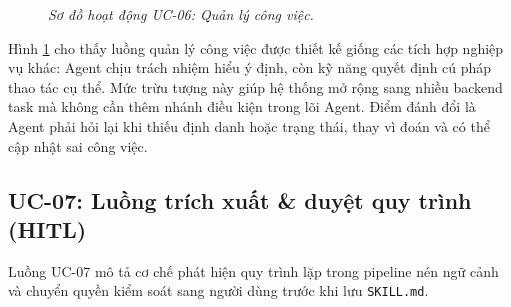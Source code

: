 \begin{figure}[p]
{
  }
  \caption{\emph{Sơ đồ hoạt động UC-06: Quản lý công việc.}}
  \label{fig:activity-uc06}
\end{figure}
\clearpage

Hình \ref{fig:activity-uc06} cho thấy luồng quản lý công việc được thiết kế giống các tích hợp nghiệp vụ khác: Agent chịu trách nhiệm hiểu ý định, còn kỹ năng quyết định cú pháp thao tác cụ thể. Mức trừu tượng này giúp hệ thống mở rộng sang nhiều backend task mà không cần thêm nhánh điều kiện trong lõi Agent. Điểm đánh đổi là Agent phải hỏi lại khi thiếu định danh hoặc trạng thái, thay vì đoán và có thể cập nhật sai công việc.

\subsection{UC-07: Luồng trích xuất \& duyệt quy trình (HITL)}
Luồng UC-07 mô tả cơ chế phát hiện quy trình lặp trong pipeline nén ngữ cảnh và chuyển quyền kiểm soát sang người dùng trước khi lưu \texttt{SKILL.md}.

